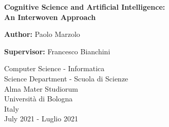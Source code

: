 \documentclass[../main.tex]{subfiles}
\begin{document}
\begin{titlepage}
    \begin{center}
        \vspace*{1cm}
        \LARGE
        \textbf{Cognitive Science and Artificial Intelligence: \\
            An Interwoven Approach}

        \vspace{1cm}

        \Large

        \textbf{Author:} Paolo Marzolo

        \textbf{Supervisor:} Francesco Bianchini

        \vspace{1.5cm}

        \normalsize
        Computer Science - Informatica\\
        Science Department - Scuola di Scienze\\
        Alma Mater Studiorum \\
        Università di Bologna  \\
        Italy\\
        July 2021 - Luglio 2021

        \vfill

    \end{center}
    \large
    

\end{titlepage}
\end{document}
